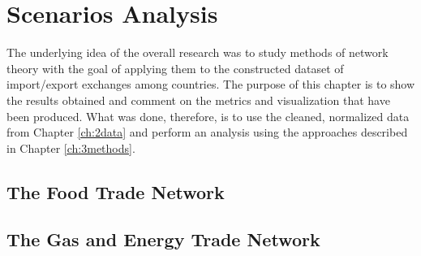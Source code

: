 \chapter{Scenarios Analysis}


The underlying idea of the overall research was to study methods of network theory with the goal of applying them to the constructed dataset of import/export exchanges among countries. The purpose of this chapter is to show the results obtained and comment on the metrics and visualization that have been produced. What was done, therefore, is to use the cleaned, normalized data from Chapter \ref{ch:2data} and perform an analysis using the approaches described in Chapter \ref{ch:3methods}.


\section{The Food Trade Network}


\section{The Gas and Energy Trade Network}
